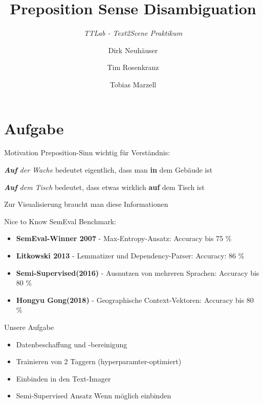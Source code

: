 \documentclass[xcolor=table]{beamer}
\title[Belief Propagation]{Preposition Sense Disambiguation}
\subtitle{\textit{TTLab - Text2Scene Praktikum}}
\author{Dirk Neuhäuser
\and 
Tim Rosenkranz
\and 
Tobias Marzell}
\institute[ode]{Prof. Dr. Alexander Mehler, Alexander Henlein}
\begin{document}
\begin{frame}
\titlepage
\end{frame}


\begin{frame}
\tableofcontents
\end{frame}


\section{Aufgabe}
\begin{frame}[t]{Motivation}\vspace{10pt}
Preposition-Sinn wichtig für Verständnis:
\begin{description}
\item \emph{\textbf{Auf} der Wache} bedeutet eigentlich, dass man \textbf{in} dem Gebäude ist
\item \emph{\textbf{Auf} dem Tisch} bedeutet, dass etwas wirklich \textbf{auf} dem Tisch ist
\end{description}
Zur Visualisierung braucht man diese Informationen
\end{frame}


\begin{frame}[t]{Nice to Know}\vspace{10pt}
	SemEval Benchmark:
	\begin{itemize}
		\item \textbf{SemEval-Winner 2007} - Max-Entropy-Ansatz: Accuracy bis 75 \%
		\item \textbf{Litkowski 2013} - Lemmatizer und Dependency-Parser: Accuracy: 86 \%
		\item \textbf{Semi-Supervised(2016)} - Ausnutzen von mehreren Sprachen: Accuracy bis 80 \%
		\item \textbf{Hongyu Gong(2018)} - Geographische Context-Vektoren: Accuracy bis 80 \%
	\end{itemize}
\end{frame}

\begin{frame}[t]{Unsere Aufgabe}\vspace{10pt}
	\begin{itemize}
		\item Datenbeschaffung und -bereinigung 
		\item Trainieren von 2 Taggern (hyperparamter-optimiert)
		\item Einbinden in den Text-Imager
		\item Semi-Supervised Ansatz Wenn möglich einbinden
	\end{itemize}
\end{frame}
\end{document}
